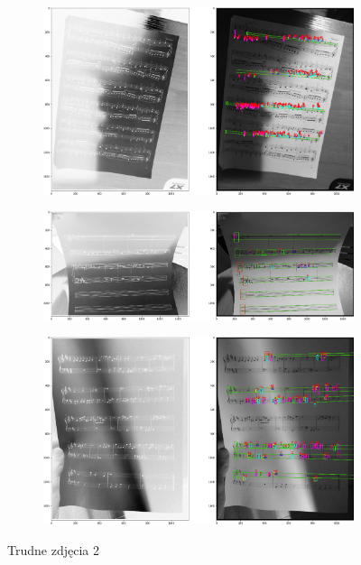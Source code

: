 \documentclass[12pt]{article}
\begin{document}
\begin{enumerate}
\begin{figure}
\begin{subfigure}[b]{0.48\linewidth}
				\end{subfigure}
				\begin{subfigure}[b]{0.48\linewidth}
					\includegraphics[width=\linewidth]{Hard/Zdj17.png}
				\end{subfigure}
				\begin{subfigure}[b]{0.48\linewidth}
					\includegraphics[width=\linewidth]{Hard/Zdj18.png}
				\end{subfigure}
				\begin{subfigure}[b]{0.48\linewidth}
					\includegraphics[width=\linewidth]{Hard/Zdj19.png}
				\end{subfigure}
				\label{fig:nuuty2}
				\caption{Trudne zdjęcia 2}
			\end{figure}
		

\end{enumerate}
\end{document}
